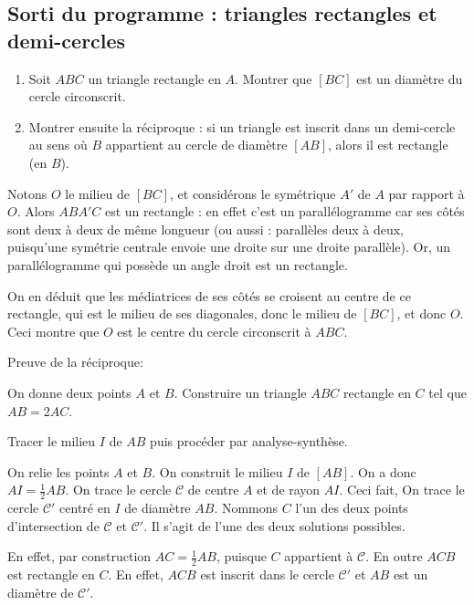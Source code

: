\subsection{Sorti du programme : triangles rectangles et demi-cercles}

\begin{exo}
\begin{enumerate}
\item Soit $ABC$ un triangle rectangle en $A$. Montrer que $[BC]$ est un diamètre du cercle circonscrit.
\item Montrer ensuite la réciproque : si un triangle est inscrit dans un demi-cercle au sens où $B$ appartient au cercle de diamètre $[AB]$, alors il est rectangle (en $B$).
\end{enumerate}

\begin{sol}

Notons $O$ le milieu de $[BC]$, et considérons le symétrique $A'$ de $A$ par rapport à $O$. Alors $ABA'C$ est un rectangle : en effet c'est un parallélogramme car ses côtés sont deux à deux de même longueur (ou aussi : parallèles deux à deux, puisqu'une symétrie centrale envoie une droite sur une droite parallèle). Or, un parallélogramme qui possède un angle droit est un rectangle.

On en déduit que les médiatrices de ses côtés se croisent au centre de ce rectangle, qui est le milieu de ses diagonales, donc le milieu de $[BC]$, et donc $O$. Ceci montre que $O$ est le centre du cercle circonscrit à $ABC$.

Preuve de la réciproque:
\end{sol}
\end{exo}


\begin{exo}
On donne deux points $A$ et $B$. Construire un triangle $ABC$ rectangle en $C$ tel que $AB = 2AC$.

\begin{hint}   Tracer le milieu $I$ de $AB$ puis procéder par analyse-synthèse.
\end{hint}      
\begin{sol} 
On relie les points $A$ et $B$. On construit le milieu $I$ de $[AB]$. On a donc $AI = \frac{1}{2}AB$. On trace le cercle $\mathcal{C}$ de centre $A$ et de rayon $AI$. Ceci fait, On trace le cercle $\mathcal{C}'$ centr\'e en $I$ de diam\`etre $AB$. Nommons $C$ l'un des deux points d'intersection de $\mathcal{C}$ et $\mathcal{C}'$. Il s'agit de l'une des deux solutions possibles.

En effet, par construction $AC = \frac{1}{2} AB$, puisque $C$ appartient \`a $\mathcal{C}$. En outre $ACB$ est rectangle en $C$. En effet, $ACB$ est inscrit dans le cercle $\mathcal{C}'$ et $AB$ est un diam\`etre de $\mathcal{C}'$.
\end{sol}  
\end{exo}  

